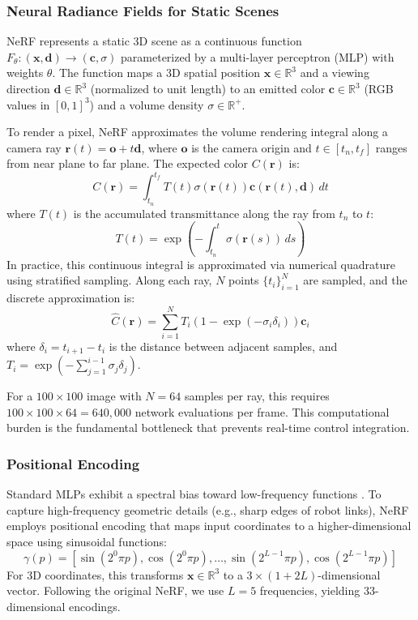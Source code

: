 \documentclass[12pt,a4paper,oneside]{report}
\begin{document}
\subsubsection{Neural Radiance Fields for Static Scenes}
NeRF represents a static 3D scene as a continuous function $F_\theta: (\mathbf{x}, \mathbf{d}) \rightarrow (\mathbf{c}, \sigma)$ parameterized by a multi-layer perceptron (MLP) with weights $\theta$. The function maps a 3D spatial position $\mathbf{x} \in \mathbb{R}^3$ and a viewing direction $\mathbf{d} \in \mathbb{R}^3$ (normalized to unit length) to an emitted color $\mathbf{c} \in \mathbb{R}^3$ (RGB values in $[0,1]^3$) and a volume density $\sigma \in \mathbb{R}^+$.

To render a pixel, NeRF approximates the volume rendering integral along a camera ray $\mathbf{r}(t) = \mathbf{o} + t\mathbf{d}$, where $\mathbf{o}$ is the camera origin and $t \in [t_n, t_f]$ ranges from near plane to far plane. The expected color $C(\mathbf{r})$ is:
\begin{equation}
C(\mathbf{r}) = \int_{t_n}^{t_f} T(t) \sigma(\mathbf{r}(t)) \mathbf{c}(\mathbf{r}(t), \mathbf{d}) \, dt
\end{equation}
where $T(t)$ is the accumulated transmittance along the ray from $t_n$ to $t$:
\begin{equation}
T(t) = \exp\left(-\int_{t_n}^{t} \sigma(\mathbf{r}(s)) \, ds\right)
\end{equation}
In practice, this continuous integral is approximated via numerical quadrature using stratified sampling. Along each ray, $N$ points $\{t_i\}_{i=1}^N$ are sampled, and the discrete approximation is:
\begin{equation}
\hat{C}(\mathbf{r}) = \sum_{i=1}^{N} T_i (1 - \exp(-\sigma_i \delta_i)) \mathbf{c}_i
\end{equation}
where $\delta_i = t_{i+1} - t_i$ is the distance between adjacent samples, and $T_i = \exp\left(-\sum_{j=1}^{i-1} \sigma_j \delta_j\right)$.

For a $100 \times 100$ image with $N = 64$ samples per ray, this requires $100 \times 100 \times 64 = 640,000$ network evaluations per frame. This computational burden is the fundamental bottleneck that prevents real-time control integration.

\subsubsection{Positional Encoding}
Standard MLPs exhibit a spectral bias toward low-frequency functions \cite{rahaman2019spectral}. To capture high-frequency geometric details (e.g., sharp edges of robot links), NeRF employs positional encoding that maps input coordinates to a higher-dimensional space using sinusoidal functions:
\begin{equation}
\gamma(p) = [\sin(2^0 \pi p), \cos(2^0 \pi p), \ldots, \sin(2^{L-1} \pi p), \cos(2^{L-1} \pi p)]
\end{equation}
For 3D coordinates, this transforms $\mathbf{x} \in \mathbb{R}^3$ to a $3 \times (1 + 2L)$-dimensional vector. Following the original NeRF, we use $L = 5$ frequencies, yielding 33-dimensional encodings.
\end{document}
